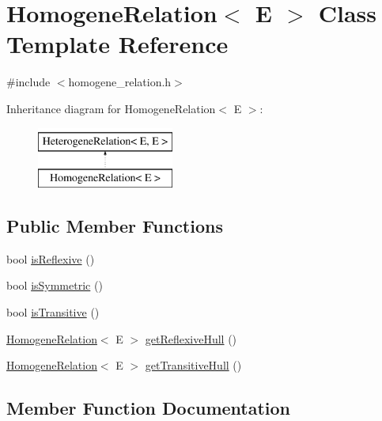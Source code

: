 \hypertarget{classHomogeneRelation}{}\section{Homogene\+Relation$<$ E $>$ Class Template Reference}
\label{classHomogeneRelation}


{\ttfamily \#include $<$homogene\+\_\+relation.\+h$>$}

Inheritance diagram for Homogene\+Relation$<$ E $>$\+:\begin{figure}[H]
\begin{center}
\leavevmode
\includegraphics[height=2.000000cm]{classHomogeneRelation}
\end{center}
\end{figure}
\subsection*{Public Member Functions}
\begin{DoxyCompactItemize}
\item 
bool \hyperlink{classHomogeneRelation_a024cada131a710595be8595e94826902}{is\+Reflexive} ()
\item 
bool \hyperlink{classHomogeneRelation_afe168dd3f5c26156d76575d55e40730b}{is\+Symmetric} ()
\item 
bool \hyperlink{classHomogeneRelation_adb9a19623987d7eaad03dfea1f2598c6}{is\+Transitive} ()
\item 
\hyperlink{classHomogeneRelation}{Homogene\+Relation}$<$ E $>$ \hyperlink{classHomogeneRelation_a399d00e67f2600ac7bb1788f929e943c}{get\+Reflexive\+Hull} ()
\item 
\hyperlink{classHomogeneRelation}{Homogene\+Relation}$<$ E $>$ \hyperlink{classHomogeneRelation_a58ad1b44e13bc9af69d41e4be18b190b}{get\+Transitive\+Hull} ()
\end{DoxyCompactItemize}


\subsection{Member Function Documentation}
\mbox{\label{classHomogeneRelation_a399d00e67f2600ac7bb1788f929e943c}} 
